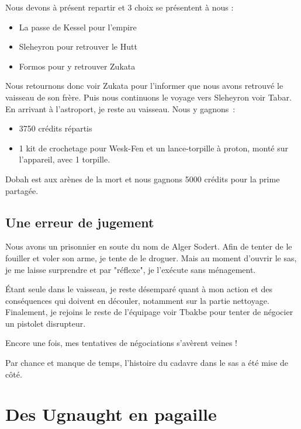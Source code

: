 \documentclass[a4paper,9pt,twoside,twocolumn,openany]{book}
\begin{document}
Nous devons à présent repartir et 3 choix se présentent à nous :
\begin{itemize}
\item La passe de Kessel pour l’empire
\item Sleheyron pour retrouver le Hutt
\item Formos pour y retrouver Zukata
\end{itemize}

Nous retournons donc voir Zukata pour l’informer que nous avons retrouvé le vaisseau de son frère.
Puis nous continuons le voyage vers Sleheyron voir Tabar. En arrivant à l'astroport, je reste au vaisseau. Nous y gagnons\ :
\begin{itemize}
\item 3750 crédits répartis
\item 1 kit de crochetage pour Wesk-Fen et un lance-torpille à proton, monté sur l’appareil, avec 1 torpille.
\end{itemize}

Dobah est aux arènes de la mort et nous gagnons 5000 crédits pour la prime partagée.

\section{Une erreur de jugement}
\subtitle{25 janvier 2015}

Nous avons un prisonnier en soute du nom de Alger Sodert. Afin de tenter de le fouiller et voler son arme, je tente de le droguer. Mais au moment d’ouvrir le sas, je me laisse surprendre et par "réflexe", je l'exécute sans ménagement.

Étant seule dans le vaisseau, je reste désemparé quant à mon action et des conséquences qui doivent en découler, notamment sur la partie nettoyage. Finalement, je rejoins le reste de l'équipage voir Tbakbe pour tenter de négocier un pistolet disrupteur.

Encore une fois, mes tentatives de négociations s’avèrent veines !

Par chance et manque de temps, l’histoire du cadavre dans le sas a été mise de côté.

\chapter{Des Ugnaught en pagaille}
\subtitle{2 avril 2016 \newline Scénario custopn \newline Présents\ : NBOO (Wootang), Nat, Yo (Karka), Rro, Ghe (Nopok), BSJ}
\end{document}
